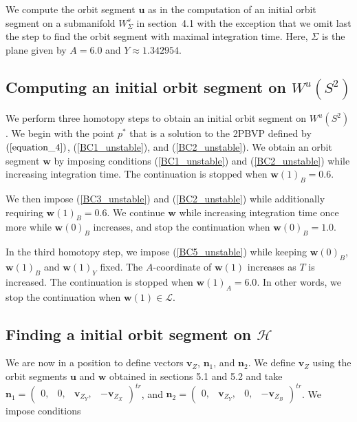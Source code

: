 \documentclass{ws-ijbc}
\begin{document}
We compute the orbit segment $\mathbf{u}$ as in the computation of an initial orbit segment on a submanifold $W^s_{\Sigma}$ in section~4.1 with the exception that we omit last the step to find the orbit segment with maximal integration time.  Here, $\Sigma$ is the plane given by $A=6.0$ and $Y\approx1.342954$.

\subsection{Computing an initial orbit segment on $W^u(S^2)$}

We perform three homotopy steps to obtain an initial orbit segment on $W^u(S^2)$.  We begin with the point $p^*$ that is a solution to the 2PBVP defined by $(\ref{equation_4})$, (\ref{BC1_unstable}), and (\ref{BC2_unstable}).  We obtain an orbit segment $\mathbf{w}$ by imposing conditions (\ref{BC1_unstable}) and (\ref{BC2_unstable}) while increasing integration time.  The continuation is stopped when $\mathbf{w}(1)_B = 0.6$.

We then impose (\ref{BC3_unstable}) and (\ref{BC2_unstable}) while additionally requiring $\mathbf{w}(1)_B=0.6$.  We continue $\mathbf{w}$ while increasing integration time once more while $\mathbf{w}(0)_B$ increases, and stop the continuation when $\mathbf{w}(0)_B=1.0$.

In the third homotopy step, we impose (\ref{BC5_unstable}) while keeping $\mathbf{w}(0)_B$, $\mathbf{w}(1)_B$ and $\mathbf{w}(1)_Y$ fixed.  The $A$-coordinate of $\mathbf{w}(1)$ increases as $T$ is increased.  The continuation is stopped when $\mathbf{w}(1)_A = 6.0$.  In other words, we stop the continuation when $\mathbf{w}(1) \in \mathscr{L}$.

\subsection{Finding a initial orbit segment on $\mathscr{H}$}

We are now in a position to define vectors $\mathbf{v}_Z$, $\mathbf{n}_1$, and $\mathbf{n}_2$.  We define $\mathbf{v}_Z$ using the orbit segments $\mathbf{u}$ and $\mathbf{w}$ obtained in sections 5.1 and 5.2 and take $\mathbf{n}_1 = \begin{pmatrix} 0, & 0, & \mathbf{v}_{Z_Y}, & -\mathbf{v}_{Z_X} \end{pmatrix}^{tr}$, and $\mathbf{n}_2 = \begin{pmatrix} 0, & \mathbf{v}_{Z_Y}, & 0, & -\mathbf{v}_{Z_B} \end{pmatrix}^{tr}$.  We impose conditions
\end{document}

